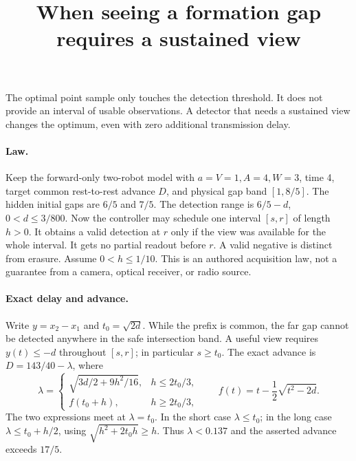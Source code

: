 \documentclass[11pt]{article}
\title{When seeing a formation gap requires a sustained view}
\begin{document}
\maketitle

The optimal point sample only touches the detection threshold.
It does not provide an interval of usable observations. A
detector that needs a sustained view changes the optimum, even
with zero additional transmission delay.

\paragraph{Law.}
Keep the forward-only two-robot model with \(a=V=1,A=4,W=3\),
time 4, target common rest-to-rest advance \(D\), and physical
gap band \([1,8/5]\). The hidden initial gaps are \(6/5\) and
\(7/5\). The detection range is \(6/5-d\), \(0<d\le3/800\).
Now the controller may schedule one interval \([s,r]\) of
length \(h>0\). It obtains a valid detection at \(r\) only if
the view was available for the whole interval. It gets no
partial readout before \(r\). A valid negative is distinct
from erasure. Assume \(0<h\le1/10\).
This is an authored acquisition law, not a guarantee from
a camera, optical receiver, or radio source.

\paragraph{Exact delay and advance.}
Write \(y=x_2-x_1\) and \(t_0=\sqrt{2d}\). While the prefix
is common, the far gap cannot be detected anywhere in the
safe intersection band. A useful view requires \(y(t)\le-d\)
throughout \([s,r]\); in particular \(s\ge t_0\). The exact
advance is \(D=143/40-\lambda\), where
\[
  \lambda=
  \begin{cases}
    \sqrt{3d/2+9h^2/16}, &h\le2t_0/3,\\
    f(t_0+h),&h\ge2t_0/3,
  \end{cases}
  \qquad f(t)=t-\frac12\sqrt{t^2-2d}.
\]
The two expressions meet at \(\lambda=t_0\). In the short case
\(\lambda\le t_0\); in the long case
\(\lambda\le t_0+h/2\), using \(\sqrt{h^2+2t_0h}\ge h\).
Thus \(\lambda<0.137\) and the asserted advance exceeds \(17/5\).
\end{document}
